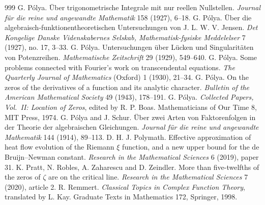 \begin{thebibliography}{999}
 G. P\'olya. \"Uber trigonometrische Integrale mit nur reellen Nullstellen. \emph{Journal f\"ur die reine und angewandte Mathematik} 158 (1927), 6--18.
 G. P\'olya. \"Uber die algebraisch-funktionentheoretischen Untersuchungen von J. L. W. V. Jensen. \emph{Det Kongelige Danske Videnskabernes Selskab, Mathematisk-fysiske Meddelelser} 7 (1927), no. 17, 3--33.
 G. P\'olya. Untersuchungen \"uber L\"ucken und Singularit\"aten von Potenzreihen. \emph{Mathematische Zeitschrift} 29 (1929), 549--640.
 G. P\'olya. Some problems connected with Fourier's work on transcendental equations. \emph{The Quarterly Journal of Mathematics} (Oxford) 1 (1930), 21--34.
 G. P\'olya. On the zeros of the derivatives of a function and its analytic character. \emph{Bulletin of the American Mathematical Society} 49 (1943), 178--191.
 G. P\'olya. \emph{Collected Papers, Vol.~II: Location of Zeros}, edited by R. P. Boas. Mathematicians of Our Time 8, MIT Press, 1974.
 G. P\'olya and J. Schur. \"Uber zwei Arten von Faktorenfolgen in der Theorie der algebraischen Gleichungen. \emph{Journal f\"ur die reine und angewandte Mathematik} 144 (1914), 89--113.
 D. H. J. Polymath. Effective approximation of heat flow evolution of the Riemann $\xi$ function, and a new upper bound for the de Bruijn--Newman constant. \emph{Research in the Mathematical Sciences} 6 (2019), paper 31.
 K. Pratt, N. Robles, A. Zaharescu and D. Zeindler. More than five-twelfths of the zeros of $\zeta$ are on the critical line. \emph{Research in the Mathematical Sciences} 7 (2020), article 2.
 R. Remmert. \emph{Classical Topics in Complex Function Theory}, translated by L. Kay. Graduate Texts in Mathematics 172, Springer, 1998.

\end{thebibliography}
